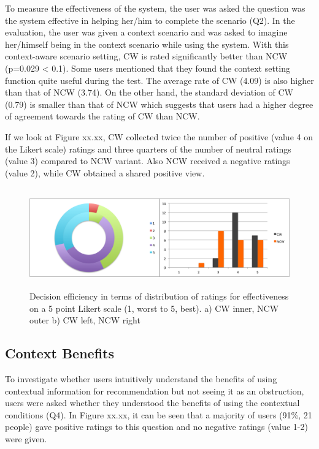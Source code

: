 To measure the effectiveness of the system, the user was asked the question was the system effective in helping her/him to complete the scenario (Q2). In the evaluation, the user was given a context scenario and was asked to imagine her/himself being in the context scenario while using the system. With this context-aware scenario setting, CW is rated significantly better than NCW (p=0.029 < 0.1). Some users mentioned that they found the context setting function quite useful during the test. The average rate of CW (4.09) is also higher than that of NCW (3.74). On the other hand, the standard deviation of CW (0.79) is smaller than that of NCW which suggests that users had a higher degree of agreement towards the rating of CW than NCW.

If we look at Figure xx.xx, CW collected twice the number of positive (value 4 on the Likert scale) ratings and three quarters of the number of neutral ratings (value 3) compared to NCW variant. Also NCW received a negative ratings (value 2), while CW obtained a shared positive view.

\begin{figure}[H]
	\centering
	\includegraphics[height=1.7in]{figures/effectiveness.png}
	\caption{Decision efficiency in terms of distribution of ratings for effectiveness on a 5 point Likert scale (1, worst to 5, best). a) CW inner, NCW outer b) CW left, NCW right}
	\label{fig:effectiveness}
\end{figure}

\subsection{Context Benefits} \label{sec:results_cb}

To investigate whether users intuitively understand the benefits of using contextual information for recommendation but not seeing it as an obstruction, users were asked whether they understood the benefits of using the contextual conditions (Q4). In Figure xx.xx, it can be seen that a majority of users (91\%, 21 people) gave positive ratings to this question and no negative ratings (value 1-2) were given.

